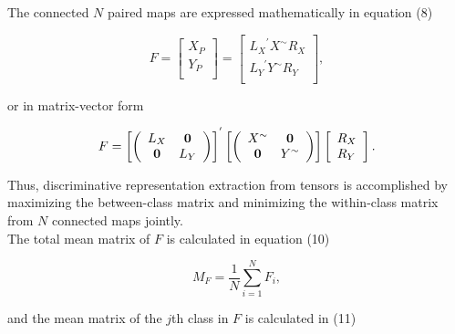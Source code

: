 \documentclass[journal]{IEEEtran}
\begin{document}
The connected $N$ paired maps are expressed mathematically in equation (8)
\begin{small}
\begin{equation}
F = \left[ \begin{array}{l}
 {X_{P}} \\
 {Y_{P}} \\
 \end{array} \right] = \left[ \begin{array}{l}
 {L_X}^\prime {X^{\sim}}{R_X} \\
 {L_Y}^\prime {Y^{\sim}}{R_Y} \\
 \end{array} \right],
\end{equation}
\end{small}
or in matrix-vector form
\begin{small}
\begin{equation}
\begin{array}{l}
 F = {\left[ {\left( {\begin{array}{*{20}{c}}
   {{L_X}} & {\bf{0}}  \\
   {\bf{0}} & {{L_Y}}  \\
\end{array}} \right)} \right]^{'}}\left[ {\left( {\begin{array}{*{20}{c}}
   {{X^{\sim}}} & {\bf{0}}  \\
   {\bf{0}} & {{Y^{\sim}}}  \\
\end{array}} \right)} \right]\left[ \begin{array}{l}
 {R_X} \\
 {R_Y} \\
 \end{array} \right]. \\
 \end{array}
\end{equation}
\end{small}
Thus, discriminative representation extraction from tensors is accomplished by maximizing the between-class matrix and minimizing the within-class matrix from $N$ connected maps jointly.\\\indent The total mean matrix of $F$ is calculated in equation (10)
\begin{small}
\begin{equation}
{M_F} = \frac{1}{N}\sum\limits_{i = 1}^N {{F_i}},
\end{equation}
\end{small}
and the mean matrix of the $j$th class in $F$ is calculated in (11)
\end{document}
